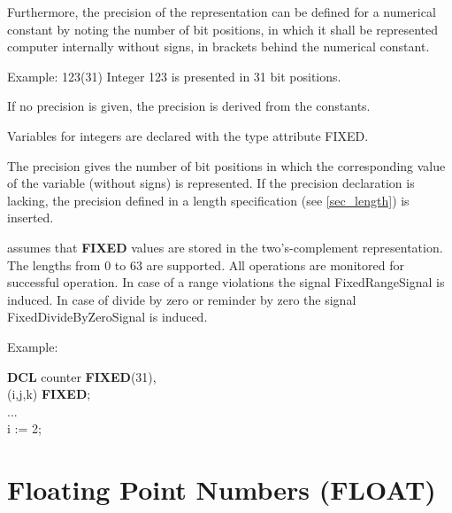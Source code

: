 Furthermore, the precision of the representation can be defined for a
numerical constant by noting the number of bit positions, in which it
shall be represented computer internally without signs, in brackets behind
the numerical constant.

Example: 123(31) \x Integer 123 is presented in 31 bit positions.

If no precision is given, the precision is derived from the constants.

Variables for integers are declared with the type attribute FIXED.




The precision gives the number of bit positions in which the
corresponding value of the variable (without signs) is represented. If
the precision declaration is lacking, the precision defined in a length
specification (see \ref{sec_length}) is inserted. 

\OpenPEARL{} assumes that {\bf FIXED} values are stored in the two's-complement
representation.  The lengths from 0 to 63 are supported.
All operations are monitored for successful operation.
In case of a range violations the signal FixedRangeSignal is induced.
In case of divide by zero or reminder by zero the signal FixedDivideByZeroSignal
is induced.

Example:

{\bf DCL} counter {\bf FIXED}(31),\\
\x (i,j,k) {\bf FIXED};\\
...\\
i := 2;

\section{Floating Point Numbers (FLOAT)}  %

